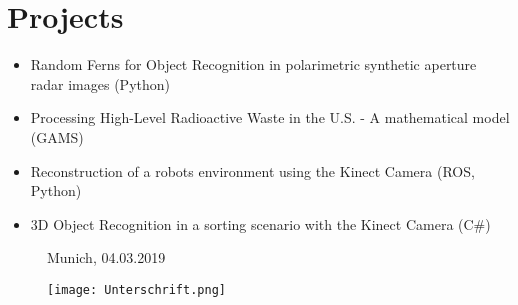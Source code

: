 \documentclass[letterpaper,11pt]{article}
\newcommand{\resumeItem}[2]{
  \item\small{
    {#1}{: #2 \vspace{-2pt}}
  }
}
\newcommand{\resumeSubItem}[2]{\resumeItem{#1}{#2}\vspace{-4pt}}
\newcommand{\resumeSubHeadingListStart}{\begin{itemize}[leftmargin=*]}
\newcommand{\resumeSubHeadingListEnd}{\end{itemize}}
\begin{document}
%
\section{Projects}
  \resumeSubHeadingListStart
  	\item{Random Ferns for Object Recognition in polarimetric synthetic aperture radar images (Python)}
    \item{Processing High-Level Radioactive Waste in the U.S. - A mathematical model (GAMS)}    	
	\item{Reconstruction of a robots environment using the Kinect Camera (ROS, Python)}
	\item{3D Object Recognition in a sorting scenario with the Kinect Camera (C\#)}
\resumeSubHeadingListEnd







\vspace{0.5pt}		
\begin{figure}[h]
	\centering	
	\begin{minipage}{0.49\textwidth}
		Munich, 04.03.2019
				
	\end{minipage}		
	\begin{minipage}{0.49\textwidth}
		\raggedright
		\texttt{[image: Unterschrift.png]}
	\end{minipage}	
\end{figure}

\end{document}

